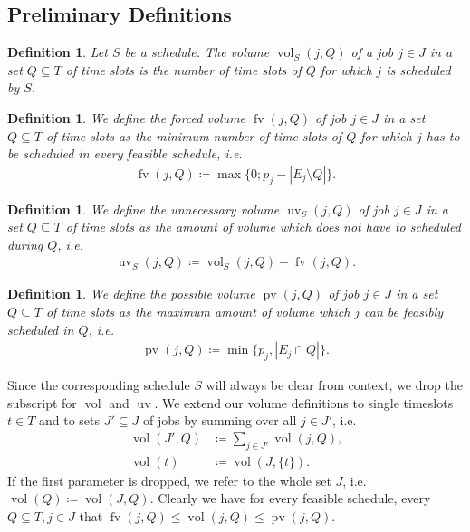 \documentclass[a4paper]{article}
\DeclareMathOperator{\fv}{fv}
\DeclareMathOperator{\uv}{uv}
\DeclareMathOperator{\pv}{pv}
\DeclareMathOperator{\vol}{vol}
\newtheorem{definition}[theorem]{Definition}
\begin{document}
\subsection{Preliminary Definitions}
\begin{definition}
  Let $S$ be a schedule.
  The \emph{volume} $\vol_S(j, Q)$ of a job $j \in J$ in a set $Q \subseteq T$ of time slots is the number of time slots of $Q$ for which $j$ is scheduled by $S$.
\end{definition}
\begin{definition}
  We define the \emph{forced volume} $\fv(j, Q)$ of job $j \in J$ in a set $Q \subseteq T$ of time slots as the minimum number of time slots of $Q$ for which $j$ has to be scheduled in every feasible schedule, i.e.
  \begin{align}
    \fv(j, Q) \coloneqq \max\{0; p_j - |E_j \setminus Q|\} \text{.}
  \end{align}
\end{definition}
\begin{definition}
  We define the \emph{unnecessary volume} $\uv_S(j, Q)$ of job $j \in J$ in a set $Q \subseteq T$ of time slots as the amount of volume which does not have to scheduled during $Q$, i.e.
  \begin{align}
    \uv_S(j, Q) \coloneqq \vol_S(j, Q) - \fv(j,Q)\text{.}
  \end{align}
\end{definition}
\begin{definition}
  We define the \emph{possible volume} $\pv(j, Q)$ of job $j \in J$ in a set $Q \subseteq T$ of time slots as the maximum amount of volume which $j$ can be feasibly scheduled in $Q$, i.e.
  \begin{align}
    \pv(j, Q) \coloneqq \min\{ p_j, | E_j \cap Q | \} \text{.}
  \end{align}
\end{definition}
Since the corresponding schedule $S$ will always be clear from context, we drop the subscript for $\vol$ and $\uv$.
We extend our volume definitions to single timeslots $t\in T$ and to sets $J' \subseteq J$ of jobs by summing over all $j \in J'$, i.e.
\begin{align}
  \vol(J', Q) &\coloneqq \sum_{j \in J'} \vol(j, Q)\text{,}
  \\
  \vol(t) &\coloneqq \vol(J, \{t\})\text{.}
\end{align}
If the first parameter is dropped, we refer to the whole set $J$, i.e.\ $\vol(Q) \coloneqq \vol(J, Q)$.
Clearly we have for every feasible schedule, every $Q \subseteq T, j \in J$ that $\fv(j, Q) \leq \vol(j, Q) \leq \pv(j, Q)$.
\end{document}
